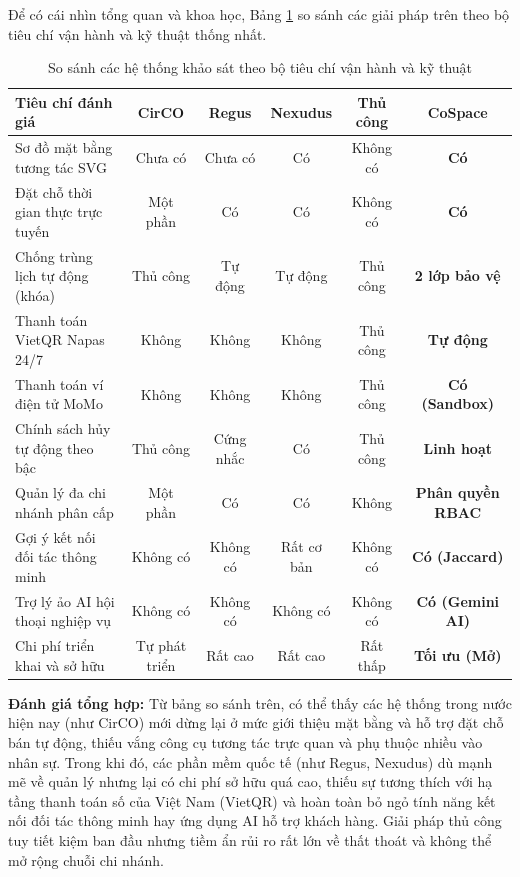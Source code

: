 Để có cái nhìn tổng quan và khoa học, Bảng \ref{tab:sosanh_hethong} so sánh các giải pháp trên theo bộ tiêu chí vận hành và kỹ thuật thống nhất.

\begin{table}[H]
\centering
\caption{So sánh các hệ thống khảo sát theo bộ tiêu chí vận hành và kỹ thuật}
\label{tab:sosanh_hethong}
\small
\renewcommand{\arraystretch}{1.2}
\begin{tabular}{|p{3.2cm}|c|c|c|c|c|}
\hline
\textbf{Tiêu chí đánh giá} & \textbf{CirCO} & \textbf{Regus} & \textbf{Nexudus} & \textbf{Thủ công} & \textbf{CoSpace} \\
\hline
Sơ đồ mặt bằng tương tác SVG & Chưa có & Chưa có & Có & Không có & \textbf{Có} \\
\hline
Đặt chỗ thời gian thực trực tuyến & Một phần & Có & Có & Không có & \textbf{Có} \\
\hline
Chống trùng lịch tự động (khóa) & Thủ công & Tự động & Tự động & Thủ công & \textbf{2 lớp bảo vệ} \\
\hline
Thanh toán VietQR Napas 24/7 & Không & Không & Không & Thủ công & \textbf{Tự động} \\
\hline
Thanh toán ví điện tử MoMo & Không & Không & Không & Thủ công & \textbf{Có (Sandbox)} \\
\hline
Chính sách hủy tự động theo bậc & Thủ công & Cứng nhắc & Có & Thủ công & \textbf{Linh hoạt} \\
\hline
Quản lý đa chi nhánh phân cấp & Một phần & Có & Có & Không & \textbf{Phân quyền RBAC} \\
\hline
Gợi ý kết nối đối tác thông minh & Không có & Không có & Rất cơ bản & Không có & \textbf{Có (Jaccard)} \\
\hline
Trợ lý ảo AI hội thoại nghiệp vụ & Không có & Không có & Không có & Không có & \textbf{Có (Gemini AI)} \\
\hline
Chi phí triển khai và sở hữu & Tự phát triển & Rất cao & Rất cao & Rất thấp & \textbf{Tối ưu (Mở)} \\
\hline
\end{tabular}
\end{table}

\noindent\textbf{Đánh giá tổng hợp:} 
Từ bảng so sánh trên, có thể thấy các hệ thống trong nước hiện nay (như CirCO) mới dừng lại ở mức giới thiệu mặt bằng và hỗ trợ đặt chỗ bán tự động, thiếu vắng công cụ tương tác trực quan và phụ thuộc nhiều vào nhân sự. Trong khi đó, các phần mềm quốc tế (như Regus, Nexudus) dù mạnh mẽ về quản lý nhưng lại có chi phí sở hữu quá cao, thiếu sự tương thích với hạ tầng thanh toán số của Việt Nam (VietQR) và hoàn toàn bỏ ngỏ tính năng kết nối đối tác thông minh hay ứng dụng AI hỗ trợ khách hàng. Giải pháp thủ công tuy tiết kiệm ban đầu nhưng tiềm ẩn rủi ro rất lớn về thất thoát và không thể mở rộng chuỗi chi nhánh.

